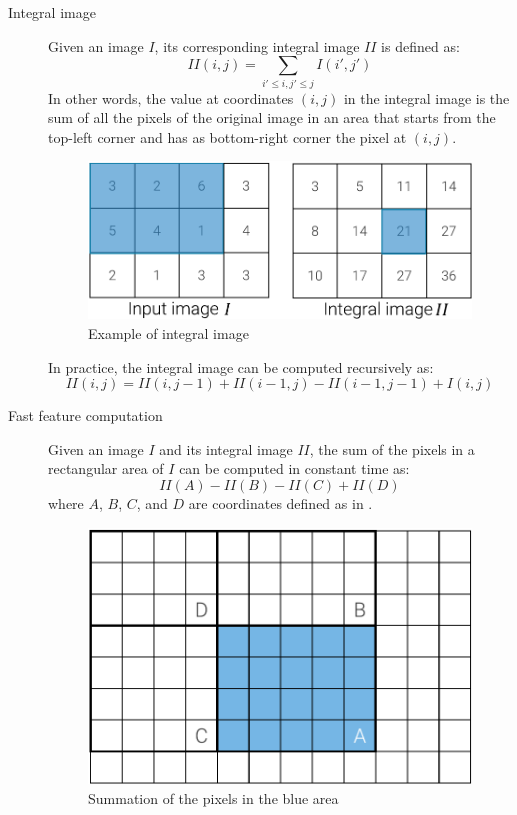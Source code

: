 \begin{description}
    \item[Integral image] 
        Given an image $I$, its corresponding integral image $II$ is defined as:
        \[ II(i, j) = \sum_{i' \leq i, j' \leq j} I(i', j') \]
        In other words, the value at coordinates $(i, j)$ in the integral image is the sum of all the pixels of the original image in an area that starts from the top-left corner and has as bottom-right corner the pixel at $(i, j)$.
        \begin{figure}[H]
            \centering
            \includegraphics[width=0.45\linewidth]{./img/_integral_image.pdf}
            \caption{Example of integral image}
        \end{figure}

        \begin{remark}
            In practice, the integral image can be computed recursively as:
            \[ II(i, j) = II(i, j-1) + II(i-1, j) - II(i-1, j-1) + I(i, j) \]
        \end{remark}

    \item[Fast feature computation] 
        Given an image $I$ and its integral image $II$, the sum of the pixels in a rectangular area of $I$ can be computed in constant time as:
        \[ II(A) - II(B) - II(C) + II(D) \]
        where $A$, $B$, $C$, and $D$ are coordinates defined as in .
        \begin{figure}[H]
            \centering
            \includegraphics[width=0.5\linewidth]{./img/_integral_image_feature.pdf}
            \caption{Summation of the pixels in the blue area}
            \label{fig:integral_image_features}
        \end{figure}


\end{description}
